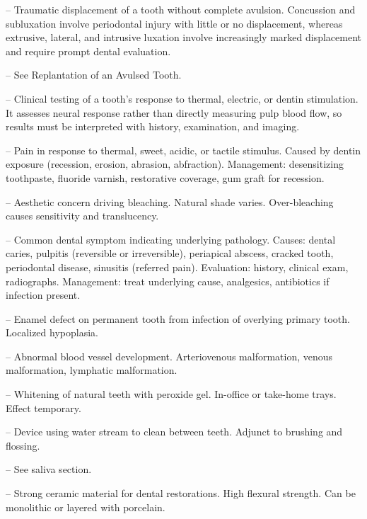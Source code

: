 -- Traumatic displacement of a tooth without complete avulsion. Concussion and subluxation involve periodontal injury with little or no displacement, whereas extrusive, lateral, and intrusive luxation involve increasingly marked displacement and require prompt dental evaluation.

-- See Replantation of an Avulsed Tooth.

-- Clinical testing of a tooth's response to thermal, electric, or dentin stimulation. It assesses neural response rather than directly measuring pulp blood flow, so results must be interpreted with history, examination, and imaging.

-- Pain in response to thermal, sweet, acidic, or tactile stimulus. Caused by dentin exposure (recession, erosion, abrasion, abfraction). Management: desensitizing toothpaste, fluoride varnish, restorative coverage, gum graft for recession.

-- Aesthetic concern driving bleaching. Natural shade varies. Over-bleaching causes sensitivity and translucency.

-- Common dental symptom indicating underlying pathology. Causes: dental caries, pulpitis (reversible or irreversible), periapical abscess, cracked tooth, periodontal disease, sinusitis (referred pain). Evaluation: history, clinical exam, radiographs. Management: treat underlying cause, analgesics, antibiotics if infection present.

-- Enamel defect on permanent tooth from infection of overlying primary tooth. Localized hypoplasia.

-- Abnormal blood vessel development. Arteriovenous malformation, venous malformation, lymphatic malformation.

-- Whitening of natural teeth with peroxide gel. In-office or take-home trays. Effect temporary.

-- Device using water stream to clean between teeth. Adjunct to brushing and flossing.

-- See saliva section.

-- Strong ceramic material for dental restorations. High flexural strength. Can be monolithic or layered with porcelain.
